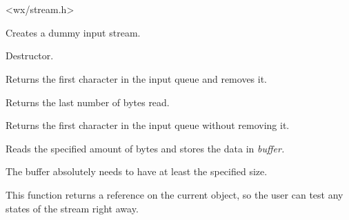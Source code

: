 \section{}\label{wxinputstream}




<wx/stream.h>



Creates a dummy input stream.



Destructor.



Returns the first character in the input queue and removes it.

\label{wxinputstreamlastread}


Returns the last number of bytes read.



Returns the first character in the input queue without removing it.



Reads the specified amount of bytes and stores the data in \it{buffer}.


The buffer absolutely needs to have at least the specified size.


This function returns a reference on the current object, so the user can test
any states of the stream right away.

